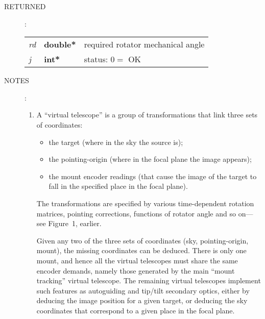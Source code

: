 \documentclass[12pt,fleqn,twoside]{article}
\renewcommand{\_}{{\tt\char'137}}     %
\newcommand{\args}[2]
{
  \goodbreak
  \begin{description}
  \item[#1]: \\[1.5ex] \nopagebreak
    \hspace*{-0.9em}
    \begin{tabular}{p{4.5em}p{5.8em}p{23.5em}}
      #2
    \end{tabular}
  \end{description}
  \vspace{-3ex}
}
\newcommand{\spec}[3]
{
  {\em {#1}} & {\bf \mbox{#2}} & {#3}
}
\newcommand{\notes}[1]
{
  \goodbreak
  \begin{description}
    \item[NOTES]: \nopagebreak
        #1
  \end{description}
  \vspace{-3ex}
}
\begin{document}
\args{RETURNED}
{
\spec{rd}{double*}{required rotator mechanical angle} \\
\spec{j }{int*}{status: $0 =$ OK}
}
\notes{
\begin{enumerate}
\setlength{\parskip}{\medskipamount}
\item A ``virtual telescope'' is a group of transformations that link
      three sets of coordinates:
      \begin{itemize}
      \item the target (where in the sky the source is);
      \item the pointing-origin (where in the focal plane the image
            appears);
      \item the mount encoder readings (that cause the image of the
            target to fall in the specified place in the focal plane).
      \end{itemize}
      The transformations are specified by various time-dependent
      rotation matrices, pointing corrections, functions of rotator
      angle and so on---see Figure~1, earlier.

      Given any two of the three sets of coordinates
      (sky, pointing-origin, mount), the missing coordinates
      can be deduced.  There is
      only one mount, and hence all the virtual telescopes must share
      the same encoder demands, namely those generated by the main
      ``mount tracking'' virtual telescope.  The remaining virtual
      telescopes implement such features as autoguiding and tip/tilt
      secondary optics, either by deducing the image position for a
      given target, or deducing the sky coordinates that correspond to
      a given place in the focal plane.


\end{enumerate}}
\end{document}
